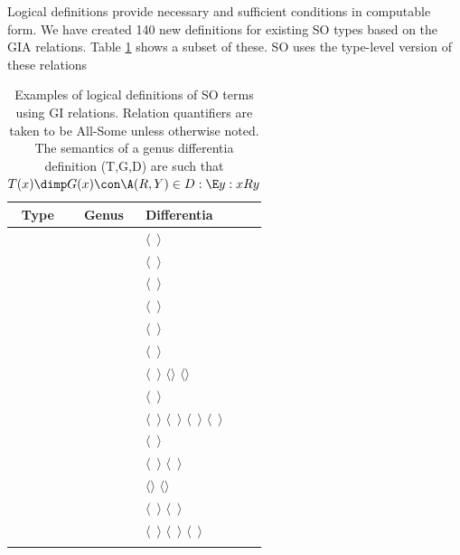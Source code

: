 \documentclass{article}
\newcommand{\rel}[1]{$\langle$#1$\rangle$}
\def\adjacentTo{\pr{adjacent\_to}}
\def\upstreamAdjacentTo{\pr{upstream\_adjacent\_to}}
\def\downstreamAdjacentTo{\pr{downstream\_adjacent\_to}}
\def\overlaps{\pr{overlaps}}
\def\containedBy{\pr{nt\_contained\_by}}
\def\disconnectedFrom{\pr{disconnected\_from}}
\def\starts{\pr{starts}}
\def\finishes{\pr{finishes}}
\def\intergenicRegion{\pr{intergenic\_region}}
\def\region{\pr{region}}
\def\intron{\pr{intron}}
\def\twintron{\pr{twintron}}
\def\codon{\pr{codon}}
\def\startCodon{\pr{start\_codon}}
\def\stopCodon{\pr{stop\_codon}}
\def\exon{\pr{exon}}
\def\interiorExon{\pr{interior\_exon}}
\def\interiorIntron{\pr{interior\_intron}}
\def\codingExon{\pr{coding\_exon}}
\def\CDS{\pr{CDS}}
\def\mRNA{\pr{mRNA}}
\def\mRNARegion{\pr{mRNA\_region}}
\def\transcript{\pr{transcript}}
\def\noncodingExon{\pr{noncoding\_exon}}
\def\fivePrimeCodingExon{\pr{five\_prime\_coding\_exon}}
\def\fivePrimeIntron{\pr{five\_prime\_intron}}
\def\fivePrimeUTR{\pr{five\_prime\_UTR}}
\def\fivePrimeSpliceSite{\pr{five\_prime\_splice\_site}}
\def\threePrimeSpliceSite{\pr{three\_prime\_splice\_site}}
\def\threePrimeUTR{\pr{three\_prime\_UTR}}
\def\interiorUTR{\pr{interior\_UTR}}
\def\UTR{\pr{UTR}}
\def\UTRIntron{\pr{UTR\_intron}}
\def\gene{\pr{gene}}
\def\spliceSite{\pr{splice\_site}}
\begin{document}
Logical definitions provide necessary and sufficient conditions in
computable form. We have created 140 new definitions for existing SO
types based on the GIA relations. Table \ref{tab:definitions} shows a
subset of these. SO uses the type-level version of these relations

\begin{longtable}{ | c | c | p{5cm} | }
\hline
Type  & Genus & Differentia \\
\hline
\fivePrimeCodingExon  & \codingExon  & \rel{\overlaps\ \startCodon} \\
\hline
\fivePrimeIntron  & \intron  & \rel{\containedBy\ \fivePrimeUTR} \\
\hline
\UTRIntron  & \intron  & \rel{\overlaps\ \UTR} \\
\hline
\twintron  & \intron  & \rel{\containedBy\ \intron} \\
\hline
\startCodon  & \codon  & \rel{\starts\ \CDS} \\
\hline
\stopCodon  & \codon  & \rel{\finishes\ \CDS} \\
\hline
\intergenicRegion & \region & \rel{\disconnectedFrom\ \gene} \rel{\upstreamAdjacentTo \gene} \rel{\downstreamAdjacentTo \gene} \\
\hline
\noncodingExon & \exon & \rel{\disconnectedFrom\ \CDS} \\
\hline
\intron & \region & \rel{\containedBy\ \transcript} \rel{\upstreamAdjacentTo\ \exon} \rel{\downstreamAdjacentTo\ \exon} \rel{\disconnectedFrom\ \exon} \\
\hline
\interiorIntron & \intron & \rel{\containedBy\ \CDS} \\
\hline
\fivePrimeUTR  & \mRNARegion  & \rel{\upstreamAdjacentTo\ \CDS} \rel{\starts\ \mRNA} \\
\hline
\threePrimeUTR  & \mRNARegion  & \rel{\downstreamAdjacentTo \CDS} \rel{\finishes \mRNA} \\
\hline
\interiorUTR  & \mRNARegion  & \rel{\downstreamAdjacentTo\ \CDS} \rel{\upstreamAdjacentTo\ \CDS} \\
\hline
\interiorExon  & \exon  & \rel{\adjacentTo\ \fivePrimeSpliceSite} \rel{\adjacentTo\ \threePrimeSpliceSite} \rel{\disconnectedFrom\ \spliceSite} \\
\hline
\caption{Examples of logical definitions of SO terms using GI
  relations. Relation quantifiers are taken to be All-Some unless otherwise
  noted. The semantics of a genus differentia definition (T,G,D) are
  such that $T(x) \dimp G(x) \con \A (R,Y) \in D : \E y : xRy$}
\label{tab:definitions}
\end{longtable}
\end{document}
